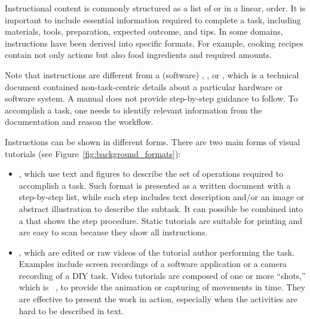 %
Instructional content is commonly structured as a list of  or  in a linear,  order.
%
It is important to include essential information required to complete a task, including materials, tools, preparation, expected outcome, and tips.
%
In some domains, instructions have been derived into specific formats. For example, cooking recipes contain not only actions but also food ingredients and required amounts.

Note that instructions are different from a (software) , , or , which is a technical document contained non-task-centric details about a particular hardware or software system. A manual does not provide step-by-step guidance to follow. To accomplish a task, one needs to identify relevant information from the documentation and reason the workflow.


Instructions can be shown in different forms. There are two main forms of visual tutorials (see Figure~\ref{fig:background_formats}):
\begin{itemize}
  \item {}, which use text and figures to describe the set of operations required to accomplish a task. Such format is presented as a written document with a step-by-step list, while each step includes text description and/or an image or abstract illustration to describe the subtask. It can possible be combined into a  that shows the step procedure. Static tutorials are suitable for printing and are easy to scan because they show all instructions.
  \item {}, which are edited or raw videos of the tutorial author performing the task. Examples include screen recordings of a software application or a camera recording of a DIY task.
  Video tutorials are composed of one or more ``shots,'' which is ~\cite{Goldman:2007:FVA:1354647}, to provide the animation or capturing of movements in time.
  They are effective to present the work in action, especially when the activities are hard to be described in text.
\end{itemize}

